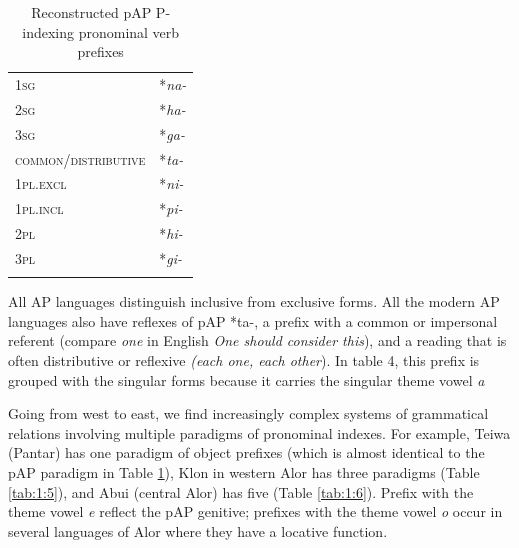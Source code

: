 \begin{table}\centering


\begin{tabular}{ll}
\mytoprule

{\scshape 1sg} & *\textit{na-}\\
{\scshape 2sg} & *\textit{ha-}\\
{\scshape 3sg} & *\textit{ga-}\\
{\scshape common/distributive} & *\textit{ta-}\\
{\scshape 1pl.excl} & *\textit{ni-}  \\
{\scshape 1pl.incl} & *\textit{pi-}\\
{\scshape 2pl} & *\textit{hi-}\\
{\scshape 3pl} & *\textit{gi-}\\
\mybottomrule
\end{tabular}
\caption{Reconstructed pAP P-indexing pronominal verb prefixes }
\label{tab:1:4}
\end{table}

All AP languages distinguish inclusive from exclusive forms. All the modern AP languages also have reflexes of pAP *ta-, a prefix with a common or impersonal referent (compare \textit{one} in English \textit{One should consider this}), and a reading that is often distributive or reflexive \textit{(each one, each other}). In table 4, this prefix is grouped with the singular forms because it carries the singular theme vowel \textit{a}

Going from west to east, we find increasingly complex systems of grammatical relations involving multiple paradigms of pronominal indexes. For example, Teiwa (Pantar) has one paradigm of object prefixes (which is almost identical to the pAP paradigm in Table \ref{tab:1:4}), Klon in western Alor has three paradigms (Table \ref{tab:1:5}), and Abui (central Alor) has five (Table \ref{tab:1:6}). Prefix with the theme vowel \textit{e} reflect the pAP genitive;  prefixes with the theme vowel \textit{o} occur in several languages of Alor where they have a locative function.



